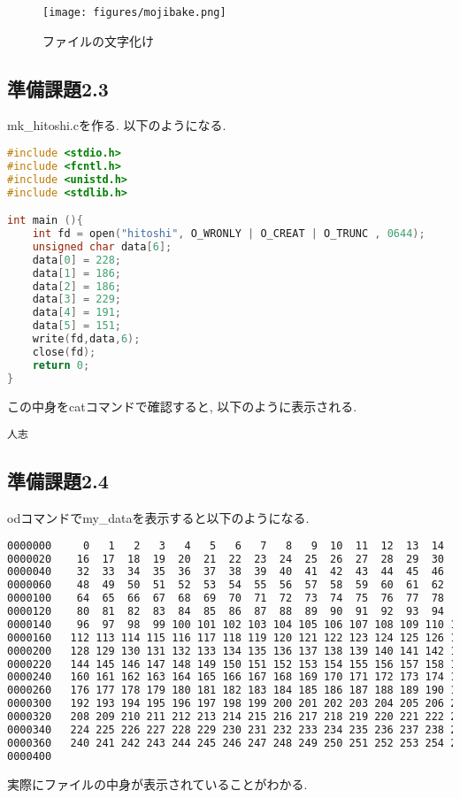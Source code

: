 \documentclass{ltjsarticle}
\begin{document}
\begin{figure}[H]
  \begin{center}
    \texttt{[image: figures/mojibake.png]}
    \caption{ファイルの文字化け}
  \end{center}
\end{figure}

\subsection{準備課題2.3}
mk\_hitoshi.cを作る. 以下のようになる. 
\begin{lstlisting}[caption=hitoshi.c,language=C]
#include <stdio.h>
#include <fcntl.h>
#include <unistd.h>
#include <stdlib.h>

int main (){
    int fd = open("hitoshi", O_WRONLY | O_CREAT | O_TRUNC , 0644);
    unsigned char data[6];
    data[0] = 228;
    data[1] = 186;
    data[2] = 186;
    data[3] = 229;
    data[4] = 191;
    data[5] = 151;
    write(fd,data,6);
    close(fd);
    return 0;
}
\end{lstlisting}
この中身をcatコマンドで確認すると, 以下のように表示される. 
\begin{lstlisting}[caption=hitoshi]
人志
\end{lstlisting}
\subsection{準備課題2.4}
odコマンドでmy\_dataを表示すると以下のようになる. 
\begin{lstlisting}[caption=od,language=bash]
% od -t u1 my_data
0000000     0   1   2   3   4   5   6   7   8   9  10  11  12  13  14  15
0000020    16  17  18  19  20  21  22  23  24  25  26  27  28  29  30  31
0000040    32  33  34  35  36  37  38  39  40  41  42  43  44  45  46  47
0000060    48  49  50  51  52  53  54  55  56  57  58  59  60  61  62  63
0000100    64  65  66  67  68  69  70  71  72  73  74  75  76  77  78  79
0000120    80  81  82  83  84  85  86  87  88  89  90  91  92  93  94  95
0000140    96  97  98  99 100 101 102 103 104 105 106 107 108 109 110 111
0000160   112 113 114 115 116 117 118 119 120 121 122 123 124 125 126 127
0000200   128 129 130 131 132 133 134 135 136 137 138 139 140 141 142 143
0000220   144 145 146 147 148 149 150 151 152 153 154 155 156 157 158 159
0000240   160 161 162 163 164 165 166 167 168 169 170 171 172 173 174 175
0000260   176 177 178 179 180 181 182 183 184 185 186 187 188 189 190 191
0000300   192 193 194 195 196 197 198 199 200 201 202 203 204 205 206 207
0000320   208 209 210 211 212 213 214 215 216 217 218 219 220 221 222 223
0000340   224 225 226 227 228 229 230 231 232 233 234 235 236 237 238 239
0000360   240 241 242 243 244 245 246 247 248 249 250 251 252 253 254 255
0000400
\end{lstlisting}
実際にファイルの中身が表示されていることがわかる. 
\end{document}
